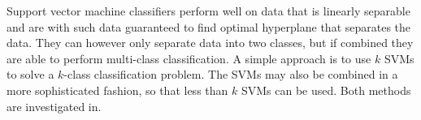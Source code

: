 Support vector machine classifiers perform well on data that is linearly separable and are with such data guaranteed to find optimal hyperplane that separates the data. They can however only separate data into two classes, but if combined they are able to perform multi-class classification. A simple approach is to use $k$ SVMs to solve a $k$-class classification problem. The SVMs may also be combined in a more sophisticated fashion, so that less than $k$ SVMs can be used. Both methods are investigated in. \cite{Mayoras99SVM}